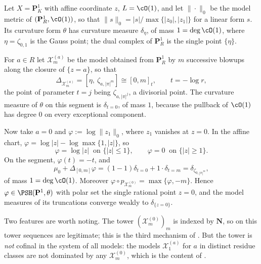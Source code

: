 \begin{example}
\label{ex:ch21-p1-refinement}
Let \(X=\mathbf P^1_K\) with affine coordinate \(z\), \(L=\cO(1)\), and let
\(\|\cdot\|_0\) be the model metric of
\((\mathbf P^1_R,\cO(1))\), so that
\(\lVert s\rVert_0=|s|/\max\{|z_0|,|z_1|\}\) for a linear form \(s\).  Its
curvature form \(\theta\) has curvature measure
\(\delta_\eta\), of mass \(1=\deg\cO(1)\), where \(\eta=\zeta_{0,1}\) is the
Gauss point; the dual complex of \(\mathbf P^1_R\) is the single point
\(\{\eta\}\).

For \(a\in R\) let \(\mathcal X_m^{(a)}\) be the model obtained from
\(\mathbf P^1_R\) by \(m\) successive blowups along the closure of
\(\{z=a\}\), so that
\[
 \Delta_{\mathcal X^{(a)}_m}=[\eta,\ \zeta_{a,|\pi|^m}]
 \cong[0,m]_t,
 \qquad t=-\log r,
\]
the point of parameter \(t=j\) being \(\zeta_{a,|\pi|^{j}}\), a divisorial
point.  The curvature measure of \(\theta\) on this segment is
\(\delta_{t=0}\), of mass \(1\), because the pullback of \(\cO(1)\) has
degree \(0\) on every exceptional component.

Now take \(a=0\) and \(\varphi:=\log\lVert z_1\rVert_0\), where \(z_1\)
vanishes at \(z=0\).  In the affine chart,
\(\varphi=\log|z|-\log\max\{1,|z|\}\), so
\[
 \varphi=\log|z|\ \text{ on }\{|z|\leq1\},
 \qquad
 \varphi=0\ \text{ on }\{|z|\geq1\}.
\]
On the segment, \(\varphi(t)=-t\), and
\[
 \mu_0+\Delta_{[0,m]}\varphi
 =(1-1)\delta_{t=0}+1\cdot\delta_{t=m}
 =\delta_{\zeta_{0,|\pi|^m}},
\]
of mass \(1=\deg\cO(1)\).  Moreover
\(\varphi\circ p_{\mathcal X^{(0)}_m}=\max\{\varphi,-m\}\).  Hence
\(\varphi\in\PSH(\mathbf P^1,\theta)\) with polar set the single rational
point \(z=0\), and the model measures of its truncations converge weakly to
\(\delta_{\{z=0\}}\).

Two features are worth noting.  The tower \((\mathcal X^{(0)}_m)_m\) is
indexed by \(\mathbf N\), so on this tower sequences are legitimate; this is
the third mechanism of .  But the tower is
\emph{not} cofinal in the system of all models: the models
\(\mathcal X^{(a)}_1\) for \(a\) in distinct residue classes are not
dominated by any \(\mathcal X^{(0)}_m\), which is the content of
.
\end{example}

